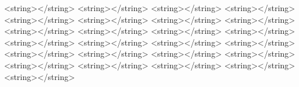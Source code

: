 	<string></string>
	<string></string>
	<string>\Gamma </string>
	<string>\Delta </string>
	<string></string>
	<string></string>
	<string></string>
	<string>\Theta </string>
	<string></string>
	<string></string>
	<string>\Lambda </string>
	<string></string>
	<string></string>
	<string>\Xi </string>
	<string></string>
	<string>\Pi </string>
	<string></string>
	<string>\Sigma </string>
	<string>\Upsilon </string>
	<string></string>
	<string></string>
	<string>\Phi </string>
	<string></string>
	<string>\Psi </string>
	<string>\Omega </string>

